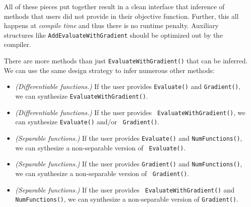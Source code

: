 All of these pieces put together result in a clean interface that inference of
methods that users did not provide in their objective function.  Further, this
all happens at {\it compile time} and thus there is no runtime penalty.
Auxiliary structures like {\tt AddEvaluateWithGradient} should be optimized out
by the compiler.

There are more methods than just {\tt EvaluateWithGradient()} that can be
inferred.  We can use the same design strategy to infer numerous other methods:

\begin{itemize}
  \item {\it (Differentiable functions.)}  If the user provides {\tt Evaluate()}
and {\tt Gradient()}, we can synthesize {\tt EvaluateWithGradient()}.

  \item {\it (Differentiable functions.)}  If the user provides {\tt
EvaluateWithGradient()}, we can synthesize {\tt Evaluate()} and/or {\tt
Gradient()}.

  \item {\it (Separable functions.)}  If the user provides {\tt Evaluate()} and
{\tt NumFunctions()}, we can sythesize a non-separable version of {\tt
Evaluate()}.

  \item {\it (Separable functions.)}  If the user provides {\tt Gradient()} and
{\tt NumFunctions()}, we can synthesize a non-separable version of {\tt
Gradient()}.

  \item {\it (Separable functions.)}  If the user provides {\tt
EvaluateWithGradient()} and {\tt NumFunctions()}, we can synthesize a
non-separable version of {\tt Gradient()}.

\end{itemize}
